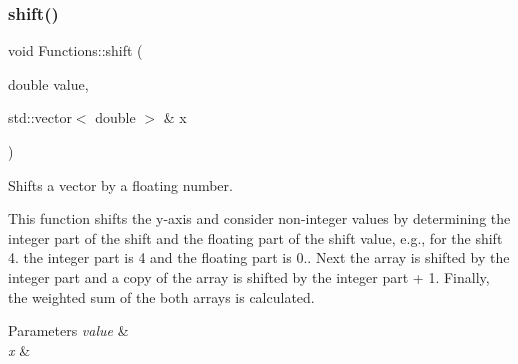 \subsubsection{\texorpdfstring{shift()}{shift()}}
{\footnotesize\ttfamily void Functions\+::shift (\begin{DoxyParamCaption}\item[{double}]{value,  }\item[{std\+::vector$<$ double $>$ \&}]{x }\end{DoxyParamCaption})}

Shifts a vector by a floating number.

This function shifts the y-\/axis and consider non-\/integer values by determining the integer part of the shift and the floating part of the shift value, e.\+g., for the shift 4. the integer part is 4 and the floating part is 0.. Next the array is shifted by the integer part and a copy of the array is shifted by the integer part + 1. Finally, the weighted sum of the both arrays is calculated. 
\begin{DoxyParams}{Parameters}
{\em value} & \\
\hline
{\em x} & \\
\hline
\end{DoxyParams}
